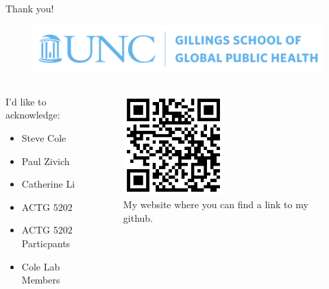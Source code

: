 \documentclass{beamer}
\begin{document}
    
 \begin{frame}
    {\Huge Thank you!}
    \begin{figure}[H] 
       \centering
        \includegraphics[width=\textwidth]{images/gillings_blue.jpg} 
       \caption*{} 
   \end{figure}  
       
       \begin{columns}
        \begin{column}{0.5\textwidth}
             I'd like to acknowledge:
             \begin{itemize}
                \item Steve Cole
                \item Paul Zivich
                \item Catherine Li
                \item ACTG 5202
                \item ACTG 5202 Particpants
                \item Cole Lab Members
             \end{itemize}
        \end{column}
        \begin{column}{0.5\textwidth}
           
           \begin{figure}[H] 
               \centering
               \includegraphics[width=0.5\textwidth]{images/qr_black.png} 
               \caption*{My website where you can find a link to my github.} 
           \end{figure} 
       \end{column} 
        
     \end{columns} 
\end{frame}
\end{document}
